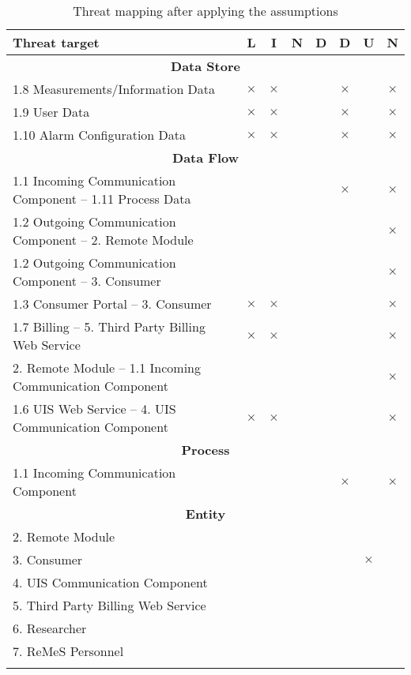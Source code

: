 \begin{center}
	\begin{longtable}{p{9cm}ccccccc}
	\toprule[1pt]
	\bf Threat target & \bf L & \bf I & \bf N & \bf D & \bf D & \bf U & \bf N \\
	\midrule[0.5pt]
	\endhead
	\multicolumn{8}{c}{\textbf{Data Store}} \\
	\midrule[0.5pt]
	\footnotesize 1.8 Measurements/Information Data & $\times$ & $\times$ &  &  & $\times$ &  & $\times$ \\
	\footnotesize 1.9 User Data 					& $\times$ & $\times$ &  &  & $\times$ &  & $\times$ \\
	\footnotesize 1.10 Alarm Configuration Data 	& $\times$ & $\times$ &  &  & $\times$ &  & $\times$ \\
	\midrule[0.5pt]
	\multicolumn{8}{c}{\textbf{Data Flow}} \\
	\midrule[0.5pt]
	\footnotesize 1.1 Incoming Communication Component -- 1.11 Process Data &          &          &  &  & $\times$ & & $\times$ \\
	\footnotesize 1.2 Outgoing Communication Component -- 2. Remote Module 	&          &          &  &  &          & & $\times$ \\
	\footnotesize 1.2 Outgoing Communication Component -- 3. Consumer 		&          &          &  &  &          & & $\times$ \\
	\footnotesize 1.3 Consumer Portal -- 3. Consumer 						& $\times$ & $\times$ &  &  &          & & $\times$ \\
	\footnotesize 1.7 Billing -- 5. Third Party Billing Web Service 		& $\times$ & $\times$ &  &  &          & & $\times$ \\
	\footnotesize 2. Remote Module -- 1.1 Incoming Communication Component  &          &          &  &  &          & & $\times$ \\
	\footnotesize 1.6 UIS Web Service -- 4. UIS Communication Component 	& $\times$ & $\times$ &  &  &          & & $\times$ \\
	\midrule[0.5pt]
	\multicolumn{8}{c}{\textbf{Process}} \\
	\midrule[0.5pt]
	\footnotesize 1.1 Incoming Communication Component 	&  &  &  &  & $\times$ & & $\times$ \\
	\midrule[0.5pt]
	\multicolumn{8}{c}{\textbf{Entity}} \\
	\midrule[0.5pt]
	\footnotesize 2. Remote Module 						&  &  &  &  &  &          & \\
	\footnotesize 3. Consumer 							&  &  &  &  &  & $\times$ & \\
	\footnotesize 4. UIS Communication Component 		&  &  &  &  &  &          & \\
	\footnotesize 5. Third Party Billing Web Service 	&  &  &  &  &  &          & \\
	\footnotesize 6. Researcher 						&  &  &  &  &  &          & \\
	\footnotesize 7. ReMeS Personnel 					&  &  &  &  &  &          & \\
	\bottomrule[1pt]
	\caption{Threat mapping after applying the assumptions}
	\label{table:threat-map-reduced}
	\end{longtable}
\end{center}


